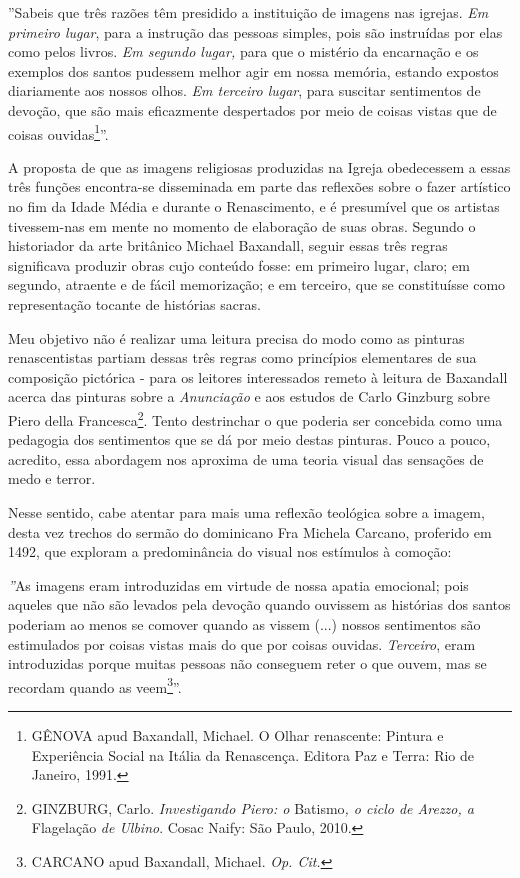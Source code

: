 ''Sabeis que três razões têm presidido a instituição de imagens nas
igrejas. \emph{Em primeiro lugar}, para a instrução das pessoas simples,
pois são instruídas por elas como pelos livros. \emph{Em segundo lugar,}
para que o mistério da encarnação e os exemplos dos santos pudessem
melhor agir em nossa memória, estando expostos diariamente aos nossos
olhos. \emph{Em terceiro lugar}, para suscitar sentimentos de devoção,
que são mais eficazmente despertados por meio de coisas vistas que de
coisas ouvidas\footnote{GÊNOVA apud Baxandall, Michael. O Olhar
  renascente: Pintura e Experiência Social na Itália da Renascença.
  Editora Paz e Terra: Rio de Janeiro, 1991.}''.

A proposta de que as imagens religiosas produzidas na Igreja obedecessem
a essas três funções encontra-se disseminada em parte das reflexões
sobre o fazer artístico no fim da Idade Média e durante o Renascimento,
e é presumível que os artistas tivessem-nas em mente no momento de
elaboração de suas obras. Segundo o historiador da arte britânico
Michael Baxandall, seguir essas três regras significava produzir obras
cujo conteúdo fosse: em primeiro lugar, claro; em segundo, atraente e de
fácil memorização; e em terceiro, que se constituísse como representação
tocante de histórias sacras.

Meu objetivo não é realizar uma leitura precisa do modo como as pinturas
renascentistas partiam dessas três regras como princípios elementares de
sua composição pictórica - para os leitores interessados remeto à
leitura de Baxandall acerca das pinturas sobre a \emph{Anunciação} e aos
estudos de Carlo Ginzburg sobre Piero della Francesca\footnote{GINZBURG,
  Carlo. \emph{Investigando Piero: o} Batismo\emph{, o ciclo de Arezzo,
  a} Flagelação \emph{de Ulbino}. Cosac Naify: São Paulo, 2010.}. Tento
destrinchar o que poderia ser concebida como uma pedagogia dos
sentimentos que se dá por meio destas pinturas. Pouco a pouco, acredito,
essa abordagem nos aproxima de uma teoria visual das sensações de medo e
terror.

Nesse sentido, cabe atentar para mais uma reflexão teológica sobre a
imagem, desta vez trechos do sermão do dominicano Fra Michela Carcano,
proferido em 1492, que exploram a predominância do visual nos estímulos
à comoção:

\emph{''}As imagens eram introduzidas em virtude de nossa apatia
emocional; pois aqueles que não são levados pela devoção quando ouvissem
as histórias dos santos poderiam ao menos se comover quando as vissem
(...) nossos sentimentos são estimulados por coisas vistas mais do que
por coisas ouvidas. \emph{Terceiro}, eram introduzidas porque muitas
pessoas não conseguem reter o que ouvem, mas se recordam quando as
veem\footnote{CARCANO apud Baxandall, Michael. \emph{Op. Cit.}}''.

